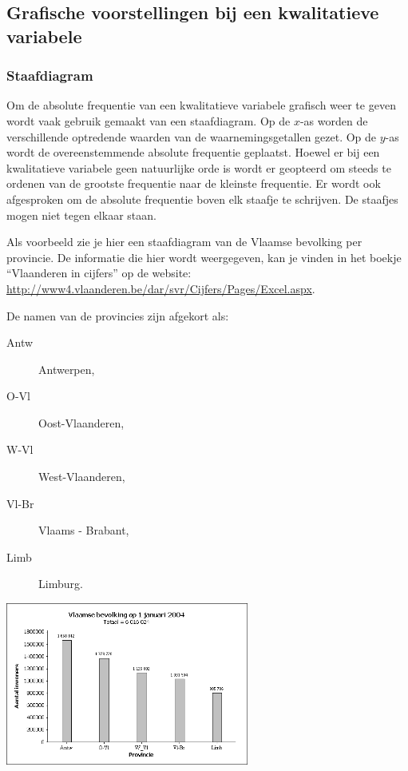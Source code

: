 \documentclass[12pt,twoside,a4paper]{article}
\begin{document}
\subsection{Grafische voorstellingen bij een kwalitatieve variabele}

\subsubsection{Staafdiagram}

Om de absolute frequentie van een kwalitatieve variabele grafisch weer te geven wordt vaak gebruik gemaakt van een staafdiagram. Op de $x$-as worden de verschillende optredende waarden van de waarnemingsgetallen gezet. Op de $y$-as wordt de overeenstemmende absolute frequentie geplaatst. Hoewel er bij een kwalitatieve variabele geen natuurlijke orde is wordt er geopteerd om steeds te ordenen van de grootste frequentie naar de kleinste frequentie. Er wordt ook afgesproken om de absolute frequentie boven elk staafje te schrijven. De staafjes mogen niet tegen elkaar staan.

Als voorbeeld zie je hier een staafdiagram
van de Vlaamse bevolking per provincie. De
informatie die hier wordt weergegeven, kan
je vinden in het boekje “Vlaanderen in
cijfers” op de website:
\url{http://www4.vlaanderen.be/dar/svr/Cijfers/Pages/Excel.aspx}.

\begin{minipage}{0.5\textwidth}
De namen van de provincies zijn afgekort als:
  \begin{description}
    \item[Antw] Antwerpen,
    \item[O-Vl] Oost-Vlaanderen,
    \item[W-Vl] West-Vlaanderen,
    \item[Vl-Br] Vlaams - Brabant,
    \item[Limb] Limburg.
  \end{description}
\end{minipage}
\begin{minipage}{0.5\textwidth}
%  
  \includegraphics[width=8cm]{vlaamse_bevolking.png}
\end{minipage}
\end{document}
